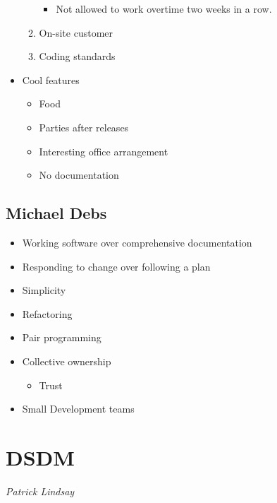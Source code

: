 \documentclass{report}
\begin{document}
\begin{itemize}
\begin{enumerate}
\begin{itemize}
									\item Not allowed to work overtime two weeks in a row.
								\end{itemize}
							\item On-site customer
							\item Coding standards
						\end{enumerate}
					\item Cool features
						\begin{itemize}
							\item Food
							\item Parties after releases
							\item Interesting office arrangement
							\item No documentation
						\end{itemize}
				\end{itemize}
			\subsection{Michael Debs}
				\begin{itemize}
					\item Working software over comprehensive documentation
					\item Responding to change over following a plan
					\item Simplicity
					\item Refactoring
					\item Pair programming
					\item Collective ownership
						\begin{itemize}
							\item Trust
						\end{itemize}
					\item Small Development teams
				\end{itemize}
		\section{DSDM}
			\textit{Patrick Lindsay}
\end{document}
